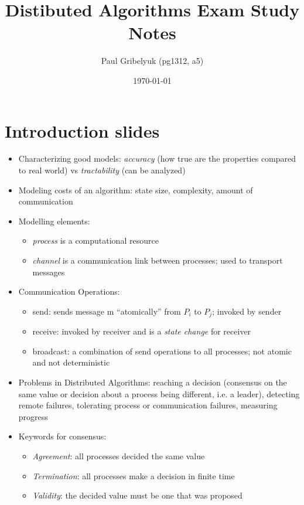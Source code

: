 \documentclass[a4paper,10pt,]{article}
\author{Paul Gribelyuk (pg1312, a5)}
\title{Distibuted Algorithms Exam Study Notes}
\date{\today}
\begin{document}
\maketitle

\section{Introduction slides}
\begin{itemize}
  \item Characterizing good models: \emph{accuracy} (how true are the properties compared to real world) vs \emph{tractability} (can be analyzed)
  \item Modeling costs of an algorithm: state size, complexity, amount of communication
  \item Modelling elements:
  \begin{itemize}
    \item \emph{process} is a computational resource
    \item \emph{channel} is a communication link between processes; used to transport messages
  \end{itemize}
  \item Communication Operations:
  \begin{itemize}
    \item send: sends message m ``atomically'' from $P_i$ to $P_j$; invoked by sender
    \item receive: invoked by receiver and is a \emph{state change} for receiver
    \item broadcast: a combination of send operations to all processes; not atomic and not deterministic
  \end{itemize}
  \item Problems in Distributed Algorithms: reaching a decision (consensus on the same value or decision about a process being different, i.e. a leader), detecting remote failures, tolerating process or communication failures, measuring progress
  \item Keywords for consensus:
  \begin{itemize}
    \item \emph{Agreement}: all processes decided the same value
    \item \emph{Termination}: all processes make a decision in finite time
    \item \emph{Validity}: the decided value must be one that was proposed
  \end{itemize}

\end{itemize}
\end{document}
